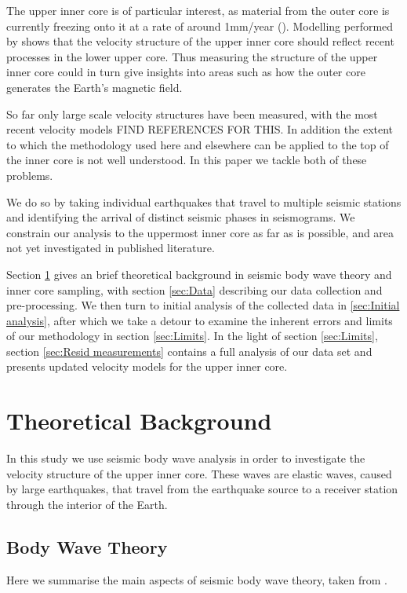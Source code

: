 \documentclass[11pt,a4paper]{article}
\begin{document}
The upper inner core is of particular interest, as material from the outer core is currently freezing onto it at a rate of around 1mm/year (\cite{Labrosse2001}). Modelling performed by \cite{Deguen2009a} shows that the velocity structure of the upper inner core should reflect recent processes in the lower upper core. Thus measuring the structure of the upper inner core could in turn give insights into areas such as how the outer core generates the Earth's magnetic field. 

So far only large scale velocity structures have been measured, with the most recent velocity models FIND REFERENCES FOR THIS. In addition the extent to which the methodology used here and elsewhere can be applied to the top of the inner core is not well understood. In this paper we tackle both of these problems.

We do so by taking individual earthquakes that travel to multiple seismic stations and identifying the arrival of distinct seismic phases in seismograms. We constrain our analysis to the uppermost inner core as far as is possible, and area not yet investigated in published literature.

Section \ref{sec:Theory} gives an brief theoretical background in seismic body wave theory and inner core sampling, with section \ref{sec:Data} describing our data collection and pre-processing. We then turn to initial analysis of the collected data in \ref{sec:Initial analysis}, after which we take a detour to examine the inherent errors and limits of our methodology in section \ref{sec:Limits}. In the light of section \ref{sec:Limits}, section \ref{sec:Resid measurements} contains a full analysis of our data set and presents updated velocity models for the upper inner core.

\section{Theoretical Background}
\label{sec:Theory}
In this study we use seismic body wave analysis in order to investigate the velocity structure of the upper inner core. These waves are elastic waves, caused by large earthquakes, that travel from the earthquake source to a receiver station through the interior of the Earth.

\subsection{Body Wave Theory}
Here we summarise the main aspects of seismic body wave theory, taken from \cite{Shearer2009}.
\end{document}
